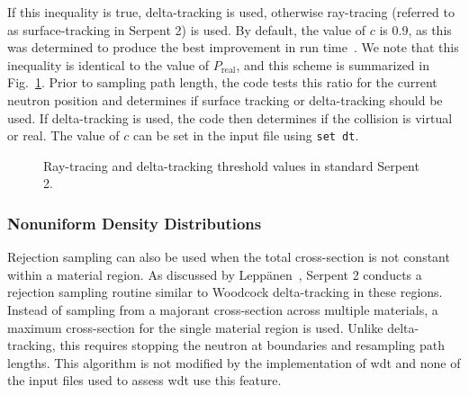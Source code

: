 If this inequality is true, delta-tracking is used, otherwise
ray-tracing (referred to as surface-tracking in Serpent 2) is used. By
default, the value of $c$ is 0.9, as this was determined to produce
the best improvement in run time~\cite{leppanen2010}. We note that
this inequality is identical to the value of $P_\mathrm{real}$, and
this scheme is summarized in Fig.~\ref{fig:ray_wdt_normal}.  Prior to
sampling path length, the code tests this ratio for the current
neutron position and determines if surface tracking or delta-tracking
should be used. If delta-tracking is used, the code then determines if
the collision is virtual or real. The value of $c$ can be set in the
input file using \verb|set dt|.
\begin{figure}[hbtp]\centering
  \caption{Ray-tracing and delta-tracking threshold values in
    standard Serpent 2.}
  \label{fig:ray_wdt_normal}
\end{figure}

\subsubsection{Nonuniform Density Distributions}
\label{sec:nonuniform}

Rejection sampling can also be used when the total cross-section is
not constant within a material region. As discussed by
Lepp\"{a}nen~\cite{leppanen2013}, Serpent 2 conducts a rejection
sampling routine similar to Woodcock delta-tracking in these
regions. Instead of sampling from a majorant cross-section across
multiple materials, a maximum cross-section for the single material
region is used. Unlike delta-tracking, this requires stopping the
neutron at boundaries and resampling path lengths. This algorithm is
not modified by the implementation of \gls{wdt} and none of the input
files used to assess \gls{wdt} use this feature.


